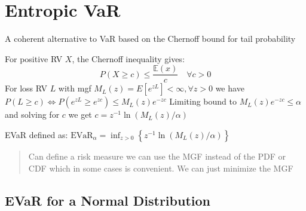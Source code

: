 \documentclass[
  oneside]{book}
\begin{document}
\hypertarget{entropic-var}{%
\section{Entropic VaR}\label{entropic-var}}

A coherent alternative to VaR based on the Chernoff bound for tail probability

For positive RV \(X\), the Chernoff inequality gives:
\[
P(X\geq c) \leq \frac{\mathbb{E}(x)}{c} \quad \forall c > 0
\]
For loss RV \(L\) with mgf \(M_L(z)=E\left[e^{z L}\right]<\infty, \forall z>0\) we have \(P(L \geq c) \Leftrightarrow P\left(e^{z L} \geq e^{z c}\right) \leq M_L(z) e^{-z c}\) Limiting bound to \(M_L(z) e^{-z c} \leq \alpha\) and solving for \(c\) we get \(c=z^{-1} \ln \left(M_L(z) / \alpha\right)\)

EVaR defined as: \(\mathrm{EVaR}_\alpha=\inf _{z>0}\left\{z^{-1} \ln \left(M_L(z) / \alpha\right)\right\}\)

\begin{quote}
Can define a risk measure we can use the MGF instead of the PDF or CDF which in some cases is convenient. We can just minimize the MGF
\end{quote}

\hypertarget{evar-for-a-normal-distribution}{%
\subsection{EVaR for a Normal Distribution}\label{evar-for-a-normal-distribution}}
\end{document}
